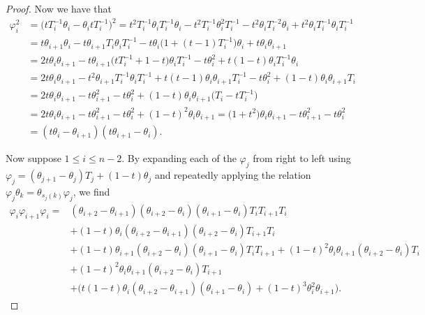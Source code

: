 \documentclass[10pt,a4paper]{amsart}
\numberwithin{equation}{section}
\theoremstyle{definition}
\begin{document}
\begin{proof}
Now we have that
\begin{align*}
 \varphi_i^2 &= \bigl(tT_i^{-1}\theta_i - \theta_i tT_i^{-1}\bigr)^2 = t^2T_i^{-1}\theta_iT_i^{-1}\theta_i - t^2 T_i^{-1}\theta_i^2 T_i^{-1} - t^2\theta_iT_i^{-2}\theta_i + t^2\theta_iT_i^{-1}\theta_iT_i^{-1} \\
& = t\theta_{i+1}\theta_{i} - t\theta_{i+1}T_i \theta_i T_i^{-1} -t\theta_i \bigl(1+(t-1)T_i^{-1}\bigr) \theta_i + t\theta_i\theta_{i+1} \\
& = 2t\theta_i\theta_{i+1} - t\theta_{i+1}\bigl(tT_i^{-1}+1-t\bigr)\theta_iT_i^{-1} - t\theta_i^2 +t(1-t)\theta_iT_i^{-1}\theta_i \\
& = 2t\theta_i\theta_{i+1} -t^2 \theta_{i+1}T_i^{-1}\theta_iT_i^{-1} +t(t-1)\theta_i\theta_{i+1}T_i^{-1}-t\theta_i^2 + (1-t)\theta_i\theta_{i+1} T_i \\
& = 2t\theta_i\theta_{i+1} - t\theta_{i+1}^2 -t\theta_{i}^2 + (1-t)\theta_i \theta_{i+1}\bigl(T_i - tT_i^{-1}\bigr)\\
& = 2t\theta_i\theta_{i+1}-t\theta_{i+1}^{2} - t\theta_i^2 +(1-t)^2 \theta_i \theta_{i+1} = \bigl(1+t^2\bigr)\theta_i\theta_{i+1} - t\theta_{i+1}^{2}-t\theta_i^{2}\\
& = (t\theta_i - \theta_{i+1})(t\theta_{i+1}-\theta_i).
\end{align*}

Now suppose $1\leq i \leq n-2$. By expanding each of the $\varphi_j$ from right to left using $\varphi_j = (\theta_{j+1}-\theta_j)T_j + (1-t)\theta_j$ and repeatedly applying the relation $\varphi_{j}\theta_k = \theta_{s_j(k)}\varphi_{j}$, we find
\begin{align*}
 \varphi_i\varphi_{i+1}\varphi_i ={}& (\theta_{i+2}-\theta_{i+1})(\theta_{i+2}-\theta_i)(\theta_{i+1}-\theta_i)T_iT_{i+1}T_i \\
& + (1-t)\theta_i (\theta_{i+2}-\theta_{i+1})(\theta_{i+2}-\theta_{i})T_{i+1}T_i \\
& + (1-t)\theta_{i+1}(\theta_{i+2}-\theta_i)(\theta_{i+1}-\theta_i)T_iT_{i+1} + (1-t)^{2}\theta_i \theta_{i+1} (\theta_{i+2}-\theta_i) T_i \\
& + (1-t)^2\theta_i \theta_{i+1} (\theta_{i+2}-\theta_i) T_{i+1} \\
 & + \bigl( t(1-t)\theta_i(\theta_{i+2}-\theta_{i+1})(\theta_{i+1}-\theta_i) + (1-t)^3 \theta_i^2 \theta_{i+1} \bigr).
\end{align*}


\end{proof}
\end{document}
